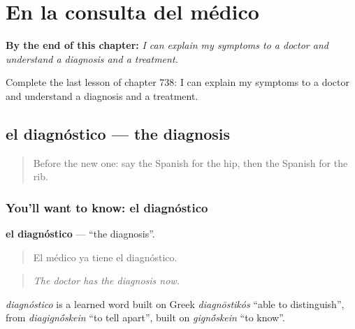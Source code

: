 
\chapter{En la consulta del médico}
\label{ch:es-en-la-consulta-del-medico}

\begin{chapteropening}
\textbf{By the end of this chapter:} \emph{I can explain my symptoms to a doctor and understand a diagnosis and a treatment.}

Complete the last lesson of chapter 738: I can explain my symptoms to a doctor and understand a diagnosis and a treatment.
\end{chapteropening}

\section[el diagnóstico]{el diagnóstico — the diagnosis}

\label{lesson:ES-C738-diagnostico}



\begin{quote}
Before the new one: say the Spanish for the hip, then the Spanish for the rib.
\end{quote}

\subsection*{You'll want to know: el diagnóstico}
\textbf{el diagnóstico} — \textquotedblleft{}the diagnosis\textquotedblright{}.

\begin{quote}
El médico ya tiene el diagnóstico.
\end{quote}

\begin{quote}
\emph{The doctor has the diagnosis now.}
\end{quote}

\begin{cousinweb}
\emph{diagnóstico} is a learned word built on Greek \emph{diagnōstikós} \textquotedblleft{}able to distinguish\textquotedblright{}, from \emph{diagign\'{\={o}}skein} \textquotedblleft{}to tell apart\textquotedblright{}, built on \emph{gign\'{\={o}}skein} \textquotedblleft{}to know\textquotedblright{}.
\end{cousinweb}


